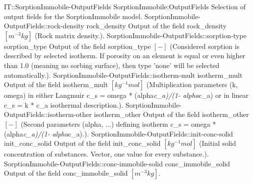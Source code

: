 \begin{SelectionType}
	{IT::SorptionImmobile-OutputFields}
	{SorptionImmobile:OutputFields}
	{{{Selection of output fields for the SorptionImmobile model.}}}
		\SelectionItem
			{SorptionImmobile-OutputFields::rock-density}
			{rock{\_}density}
			{{{Output of the field rock{\_}density }{$[m^{-3}kg]$}{ (Rock matrix density.).}}}
		\SelectionItem
			{SorptionImmobile-OutputFields::sorption-type}
			{sorption{\_}type}
			{{{Output of the field sorption{\_}type }{$[-]$}{ (Considered sorption is described by selected isotherm. If porosity on an element is equal or even higher than 1.0 (meaning no sorbing surface), then type 'none' will be selected automatically.).}}}
		\SelectionItem
			{SorptionImmobile-OutputFields::isotherm-mult}
			{isotherm{\_}mult}
			{{{Output of the field isotherm{\_}mult }{$[kg^{-1}mol]$}{ (Multiplication parameters (k, omega) in either Langmuir c{\_}s = omega * (alpha}\textit{c{\_}a)/(1- alpha}{c{\_}a) or in linear c{\_}s = k * c{\_}a isothermal description.).}}}
		\SelectionItem
			{SorptionImmobile-OutputFields::isotherm-other}
			{isotherm{\_}other}
			{{{Output of the field isotherm{\_}other }{$[-]$}{ (Second parameters (alpha, ...) defining isotherm  c{\_}s = omega * (alpha}\textit{c{\_}a)/(1- alpha}{c{\_}a).).}}}
		\SelectionItem
			{SorptionImmobile-OutputFields::init-conc-solid}
			{init{\_}conc{\_}solid}
			{{{Output of the field init{\_}conc{\_}solid }{$[kg^{-1}mol]$}{ (Initial solid concentration of substances. Vector, one value for every substance.).}}}
		\SelectionItem
			{SorptionImmobile-OutputFields::conc-immobile-solid}
			{conc{\_}immobile{\_}solid}
			{{{Output of the field conc{\_}immobile{\_}solid }{$[m^{-3}kg]$}{.}}}
\end{SelectionType}

